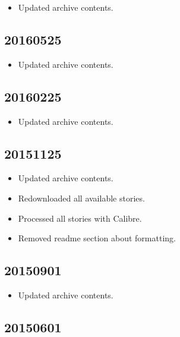 \documentclass[hidelinks,a4paper,12pt]{article}
\begin{document}
\begin{itemize}
\item Updated archive contents.
\end{itemize}

\subsection{20160525}  \label{sec:changelog_20160525}

\begin{itemize}
\item Updated archive contents.
\end{itemize}

\subsection{20160225}  \label{sec:changelog_20160225}

\begin{itemize}
\item Updated archive contents.
\end{itemize}

\subsection{20151125}  \label{sec:changelog_20151125}

\begin{itemize}
\item Updated archive contents.
\item Redownloaded all available stories.
\item Processed all stories with Calibre.
\item Removed readme section about formatting.
\end{itemize}

\subsection{20150901}  \label{sec:changelog_20150901}

\begin{itemize}
\item Updated archive contents.
\end{itemize}

\subsection{20150601}  \label{sec:changelog_20150601}
\end{document}
